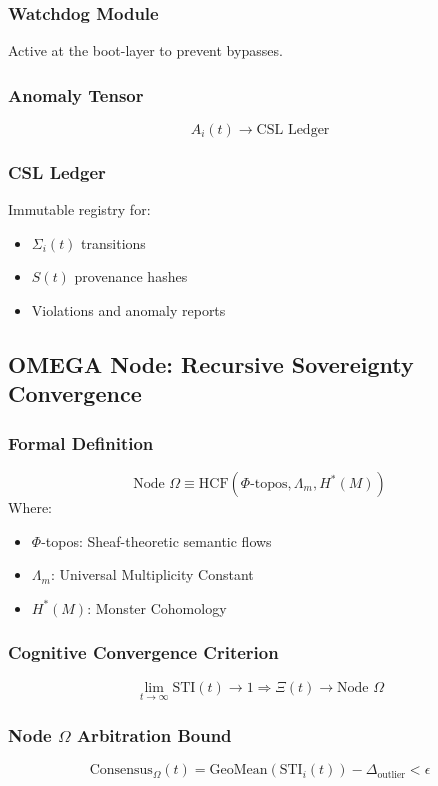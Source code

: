 \documentclass[12pt]{article}
\begin{document}
\subsubsection{Watchdog Module}
Active at the boot-layer to prevent bypasses.

\subsubsection{Anomaly Tensor}
\[
A_i(t) \rightarrow \text{CSL Ledger}
\]

\subsubsection{CSL Ledger}
Immutable registry for:
\begin{itemize}
  \item $\Sigma_i(t)$ transitions
  \item $S(t)$ provenance hashes
  \item Violations and anomaly reports
\end{itemize}

\subsection{OMEGA Node: Recursive Sovereignty Convergence}
\subsubsection{Formal Definition}
\[
\text{Node } \Omega \equiv \text{HCF}(\Phi\text{-topos}, \Lambda_m, H^\ast(M))
\]
Where:
\begin{itemize}
  \item $\Phi$-topos: Sheaf-theoretic semantic flows
  \item $\Lambda_m$: Universal Multiplicity Constant
  \item $H^\ast(M)$: Monster Cohomology
\end{itemize}

\subsubsection{Cognitive Convergence Criterion}
\[
\lim_{t \to \infty} \text{STI}(t) \rightarrow 1 \Rightarrow \Xi(t) \rightarrow \text{Node } \Omega
\]

\subsubsection{Node $\Omega$ Arbitration Bound}
\[
\text{Consensus}_\Omega(t) = \text{GeoMean}(\text{STI}_i(t)) - \Delta_{\text{outlier}} < \epsilon
\]
\end{document}
